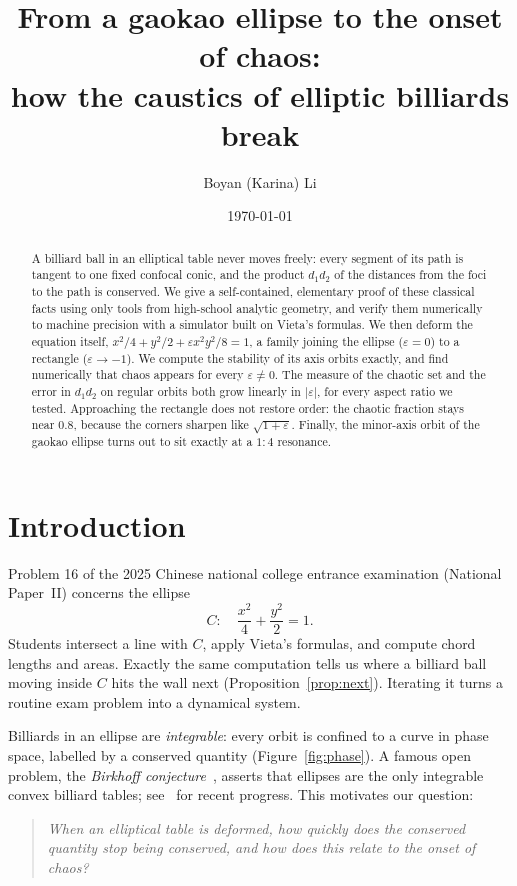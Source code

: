 \documentclass[11pt]{amsart}
\title[Breaking the caustics of elliptic billiards]{From a gaokao ellipse to the onset of chaos:\\ how the caustics of elliptic billiards break}
\author{Boyan (Karina) Li}
\date{\today}
\theoremstyle{remark}
\begin{document}
\begin{abstract}
A billiard ball in an elliptical table never moves freely: every segment of its
path is tangent to one fixed confocal conic, and the product $d_1d_2$ of the
distances from the foci to the path is conserved. We give a self-contained,
elementary proof of these classical facts using only tools from high-school
analytic geometry, and verify them numerically to machine precision with a
simulator built on Vieta's formulas. We then deform the equation itself,
$x^2/4 + y^2/2 + \varepsilon x^2y^2/8 = 1$, a family joining the ellipse
($\varepsilon = 0$) to a rectangle ($\varepsilon \to -1$). We compute the
stability of its axis orbits exactly, and find numerically that chaos appears
for every $\varepsilon \ne 0$. The measure of the chaotic set and the error in
$d_1d_2$ on regular orbits both grow linearly in $|\varepsilon|$, for every
aspect ratio we tested. Approaching the rectangle does not restore order:
the chaotic fraction stays near $0.8$, because the corners sharpen like
$\sqrt{1+\varepsilon}$. Finally, the minor-axis orbit of the gaokao ellipse
turns out to sit exactly at a $1{:}4$ resonance.
\end{abstract}
\maketitle

\section{Introduction}

Problem 16 of the 2025 Chinese national college entrance examination
(National Paper~II) concerns the ellipse
\[
  C:\quad \frac{x^2}{4} + \frac{y^2}{2} = 1 .
\]
Students intersect a line with $C$, apply Vieta's formulas, and compute
chord lengths and areas. Exactly the same computation tells us where a
billiard ball moving inside $C$ hits the wall next
(Proposition~\ref{prop:next}). Iterating it turns a routine exam problem into a
dynamical system.

Billiards in an ellipse are \emph{integrable}: every orbit is confined to a
curve in phase space, labelled by a conserved quantity
(Figure~\ref{fig:phase}). A famous open problem, the \emph{Birkhoff
conjecture}~\cite{Birkhoff1927}, asserts that ellipses are the only
integrable convex billiard tables; see~\cite{AvilaDeSimoiKaloshin2016,
KaloshinSorrentino2018} for recent progress. This motivates our question:
\begin{quote}
\emph{When an elliptical table is deformed, how quickly does the conserved
quantity stop being conserved, and how does this relate to the onset of chaos?}
\end{quote}
\end{document}
